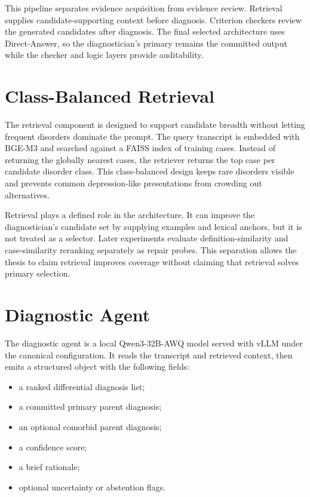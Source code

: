 This pipeline separates evidence acquisition from evidence review. Retrieval supplies candidate-supporting context before diagnosis. Criterion checkers review the generated candidates after diagnosis. The final selected architecture uses Direct-Answer, so the diagnostician's primary remains the committed output while the checker and logic layers provide auditability.

\section{Class-Balanced Retrieval}

The retrieval component is designed to support candidate breadth without letting frequent disorders dominate the prompt. The query transcript is embedded with BGE-M3 and searched against a FAISS index of training cases. Instead of returning the globally nearest cases, the retriever returns the top case per candidate disorder class. This class-balanced design keeps rare disorders visible and prevents common depression-like presentations from crowding out alternatives.

Retrieval plays a defined role in the architecture. It can improve the diagnostician's candidate set by supplying examples and lexical anchors, but it is not treated as a selector. Later experiments evaluate definition-similarity and case-similarity reranking separately as repair probes. This separation allows the thesis to claim retrieval improves coverage without claiming that retrieval solves primary selection.

\section{Diagnostic Agent}

The diagnostic agent is a local Qwen3-32B-AWQ model served with vLLM under the canonical configuration. It reads the transcript and retrieved context, then emits a structured object with the following fields:

\begin{itemize}
\item a ranked differential diagnosis list;
\item a committed primary parent diagnosis;
\item an optional comorbid parent diagnosis;
\item a confidence score;
\item a brief rationale;
\item optional uncertainty or abstention flags.
\end{itemize}

